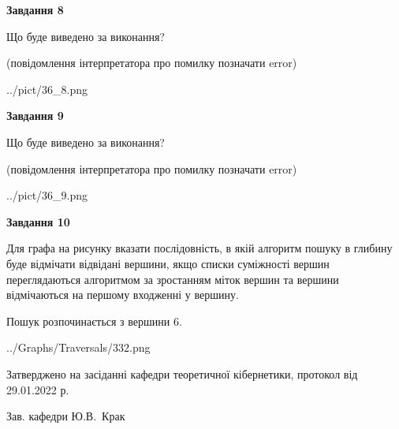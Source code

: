 \documentclass[12pt, ukrainian]{article}
\begin{document}
{\begin {large}
{\begin {center}\textbf{Завдання 8}\end {center}}\par
Що буде виведено за виконання?\par
 (повідомлення інтерпретатора про помилку позначати error)\par
\begin{center}
	{../pict/36_8.png}
\end{center}
\newpage

{\begin {center}\textbf{Завдання 9}\end {center}}\par
Що буде виведено за виконання?\par
 (повідомлення інтерпретатора про помилку позначати error)\par
\begin{center}
	{../pict/36_9.png}
\end{center}
\newpage

{\begin {center}\textbf{Завдання 10}\end {center}}\par
Для графа на рисунку вказати послідовність, в якій алгоритм пошуку в глибину буде відмічати відвідані вершини, якщо списки суміжності вершин переглядаються алгоритмом за зростанням міток вершин та вершини відмічаються на першому вход\-женні у вершину.\par
Пошук розпочинається з вершини 6.\par

\begin{center}
	{../Graphs/Traversals/332.png}
\end{center}\par
\newpage


\end {large}
}
{\smallskip \begin {small} Затверджено на засіданні кафедри теоретичної кібернетики, протокол  від   29.01.2022 р.\par\smallskip\smallskip
{\parbox {6.5 cm}{Зав. кафедри \dotfill Ю.В.~Крак}} \end{small}}
\end{document}
